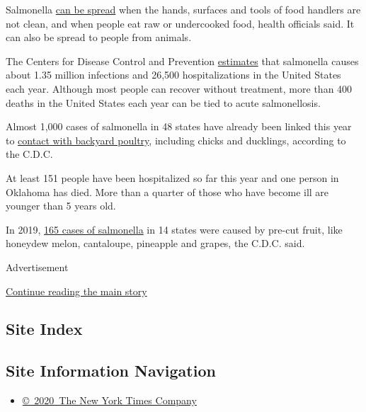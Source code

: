 Salmonella
\href{https://www.fda.gov/food/foodborne-pathogens/salmonella-salmonellosis}{can
be spread} when the hands, surfaces and tools of food handlers are not
clean, and when people eat raw or undercooked food, health officials
said. It can also be spread to people from animals.

The Centers for Disease Control and Prevention
\href{https://www.cdc.gov/salmonella/}{estimates} that salmonella causes
about 1.35 million infections and 26,500 hospitalizations in the United
States each year. Although most people can recover without treatment,
more than 400 deaths in the United States each year can be tied to acute
salmonellosis.

Almost 1,000 cases of salmonella in 48 states have already been linked
this year to
\href{https://www.cdc.gov/salmonella/backyardpoultry-05-20/index.html}{contact
with backyard poultry}, including chicks and ducklings, according to the
C.D.C.

At least 151 people have been hospitalized so far this year and one
person in Oklahoma has died. More than a quarter of those who have
become ill are younger than 5 years old.

In 2019,
\href{https://www.cdc.gov/salmonella/javiana-12-19/index.html}{165 cases
of salmonella} in 14 states were caused by pre-cut fruit, like honeydew
melon, cantaloupe, pineapple and grapes, the C.D.C. said.

Advertisement

\protect\hyperlink{after-bottom}{Continue reading the main story}

\hypertarget{site-index}{%
\subsection{Site Index}\label{site-index}}

\hypertarget{site-information-navigation}{%
\subsection{Site Information
Navigation}\label{site-information-navigation}}

\begin{itemize}
\tightlist
\item
  \href{https://help.nytimes3xbfgragh.onion/hc/en-us/articles/115014792127-Copyright-notice}{©~2020~The
  New York Times Company}
\end{itemize}

